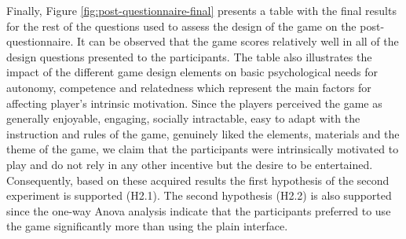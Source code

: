 Finally, Figure \ref{fig:post-questionnaire-final} presents a table with the final results for the rest of the questions used to assess the design of the game on the post-questionnaire. It can be observed that the game scores relatively well in all of the design questions presented to the participants. The table also illustrates the impact of the different game design elements on basic psychological needs for autonomy, competence and relatedness which represent the main factors for affecting player's intrinsic motivation. Since the players perceived the game as generally enjoyable, engaging, socially intractable, easy to adapt with the instruction and rules of the game, genuinely liked the elements, materials and the theme of the game, we claim that the participants were intrinsically motivated to play and do not rely in any other incentive but the desire to be entertained. Consequently, based on these acquired results the first hypothesis of the second experiment is supported (H2.1). The second hypothesis (H2.2) is also supported since the one-way Anova analysis indicate that the participants preferred to use the game significantly more than using the plain interface.  